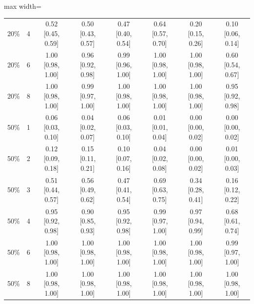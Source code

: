 \begin{table}[htbp]
\begin{adjustbox}{max width=\linewidth}
\begin{tabular}{llcccccc}
20\% & 4 & 0.52 [0.45, 0.59] & 0.50 [0.43, 0.57] & 0.47 [0.40, 0.54] & 0.64 [0.57, 0.70] & 0.20 [0.15, 0.26] & 0.10 [0.06, 0.14] \\
20\% & 6 & 1.00 [0.98, 1.00] & 0.96 [0.92, 0.98] & 0.99 [0.96, 1.00] & 1.00 [0.98, 1.00] & 1.00 [0.98, 1.00] & 0.60 [0.54, 0.67] \\
20\% & 8 & 1.00 [0.98, 1.00] & 0.99 [0.97, 1.00] & 1.00 [0.98, 1.00] & 1.00 [0.98, 1.00] & 1.00 [0.98, 1.00] & 0.95 [0.92, 0.98] \\
50\% & 1 & 0.06 [0.03, 0.10] & 0.04 [0.02, 0.07] & 0.06 [0.03, 0.10] & 0.01 [0.01, 0.04] & 0.00 [0.00, 0.02] & 0.00 [0.00, 0.02] \\
50\% & 2 & 0.12 [0.09, 0.18] & 0.15 [0.11, 0.21] & 0.10 [0.07, 0.16] & 0.04 [0.02, 0.08] & 0.00 [0.00, 0.02] & 0.01 [0.00, 0.03] \\
50\% & 3 & 0.51 [0.44, 0.57] & 0.56 [0.49, 0.62] & 0.47 [0.41, 0.54] & 0.69 [0.63, 0.75] & 0.34 [0.28, 0.41] & 0.16 [0.12, 0.22] \\
50\% & 4 & 0.95 [0.92, 0.98] & 0.90 [0.85, 0.93] & 0.95 [0.92, 0.98] & 0.99 [0.97, 1.00] & 0.97 [0.94, 0.99] & 0.68 [0.61, 0.74] \\
50\% & 6 & 1.00 [0.98, 1.00] & 1.00 [0.98, 1.00] & 1.00 [0.98, 1.00] & 1.00 [0.98, 1.00] & 1.00 [0.98, 1.00] & 0.99 [0.97, 1.00] \\
50\% & 8 & 1.00 [0.98, 1.00] & 1.00 [0.98, 1.00] & 1.00 [0.98, 1.00] & 1.00 [0.98, 1.00] & 1.00 [0.98, 1.00] & 1.00 [0.98, 1.00] \\
\bottomrule
\end{tabular}
\end{adjustbox}
\end{table}
